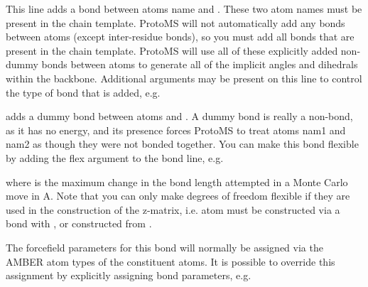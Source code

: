 \documentclass[letterpaper,10pt,english]{sphinxmanual}
\begin{document}
%
\begin{sphinxVerbatim}[commandchars=\\\{\}]
  
\end{sphinxVerbatim}

This line adds a bond between atoms name  and . These two atom names must be present in the chain template. ProtoMS will not automatically add any bonds between atoms (except inter-residue bonds), so you must add all bonds that are present in the chain template. ProtoMS will use all of these explicitly added non-dummy bonds between atoms to generate all of the implicit angles and dihedrals within the backbone. Additional arguments may be present on this line to control the type of bond that is added, e.g.

%
\begin{sphinxVerbatim}[commandchars=\\\{\}]
   
\end{sphinxVerbatim}

adds a dummy bond between atoms  and . A dummy bond is really a non-bond, as it has no energy, and its presence forces ProtoMS to treat atoms nam1 and nam2 as though they were not bonded together. You can make this bond flexible by adding the flex argument to the bond line, e.g.

%
\begin{sphinxVerbatim}[commandchars=\\\{\}]
    
\end{sphinxVerbatim}

where  is the maximum change in the bond length attempted in a Monte Carlo move in A. Note that you can only make degrees of freedom flexible if they are used in the construction of the z-matrix, i.e. atom  must be constructed via a bond with , or  constructed from .

The forcefield parameters for this bond will normally be assigned via the AMBER atom types of the constituent atoms. It is possible to override this assignment by explicitly assigning bond parameters, e.g.
\end{document}

